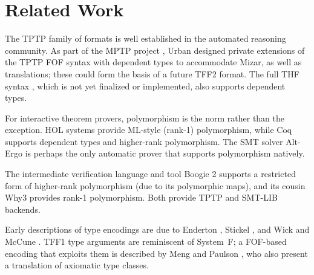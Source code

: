 \section{Related Work}
\label{sec_related}

The TPTP family of formats is well established in the automated reasoning
community. As part of the MPTP project \cite{urban-2006}, Urban designed private
extensions of the TPTP FOF syntax with dependent types to
accommodate Mizar, as well as translations;
these could form the basis of a future TFF2 format.
The full THF syntax \cite{sutcliffe-benzmueller-2010},
which is not yet finalized or implemented,
also supports dependent types.


For interactive theorem provers, polymorphism is the norm rather
than the exception. HOL systems
\cite{gordon-melham-1993,harrison-1996,nipkow-et-al-2002} provide
ML-style (rank-1) polymorphism, while Coq
\cite{bertot-casteran-2004} supports dependent types and higher-rank
polymorphism.
The SMT solver Alt-Ergo \cite{bobot-et-al-2008} is perhaps the only automatic
prover that supports polymorphism natively.

The intermediate verification language and tool Boogie 2 \cite{leino-ruemmer-2010}
supports a restricted form of higher-rank polymorphism (due to its polymorphic maps),
and its cousin Why3 \cite{bobot-et-al-2011}
provides rank-1 polymorphism. Both provide TPTP and SMT-LIB backends.

Early descriptions of type encodings are due to Enderton
\cite[\S4.3]{enderton-1972}, Stickel \cite[p.~99]{stickel-1986}, and Wick and
McCune \cite[\S4]{wick-mccune-1989}. TFF1 type arguments are reminiscent of
System~F; a FOF-based encoding that exploits them is described by Meng and
Paulson \cite{meng-paulson-2008-trans}, who also present a translation of
axiomatic type classes.

